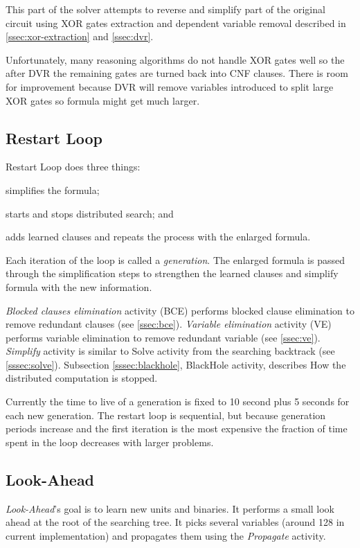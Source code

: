 This part of the solver attempts to reverse and simplify part of the
original circuit using XOR gates extraction and dependent variable
removal described in \ref{ssec:xor-extraction} and \ref{ssec:dvr}.

Unfortunately, many reasoning algorithms do not handle XOR gates
well so the after DVR the remaining gates are turned back into CNF
clauses. There is room for improvement because DVR will remove
variables introduced to split large XOR gates so formula might get
much larger.


\subsection{Restart Loop}

Restart Loop does three things:
\begin{inparaenum}[a)]
  \item simplifies the formula;
  \item starts and stops distributed search; and
  \item adds learned clauses and repeats the process with the enlarged formula.
\end{inparaenum} Each iteration of the loop is called a
\emph{generation}. The enlarged formula is passed through the
simplification steps to strengthen the learned clauses and simplify
formula with the new information.

\emph{Blocked clauses elimination} activity (BCE) performs
blocked clause elimination to remove redundant clauses (see
\ref{ssec:bce}). \emph{Variable elimination} activity (VE) performs
variable elimination to remove redundant variable (see
\ref{ssec:ve}). \emph{Simplify} activity is similar to Solve
activity from the searching backtrack (see \ref{sssec:solve}).
Subsection \ref{sssec:blackhole}, BlackHole activity, describes
How the distributed computation is stopped.

Currently the time to live of a generation is fixed to 10 second
plus 5 seconds for each new generation.  The restart loop is sequential, but because generation
periods increase and the first iteration is the most expensive the
fraction of time spent in the loop decreases with larger problems.


\subsection{Look-Ahead}

\emph{Look-Ahead}'s goal is to learn new units and binaries.
It performs a small look ahead at the root of the searching tree. It
picks several variables (around 128 in current implementation)
and propagates them using the \emph{Propagate} activity.

